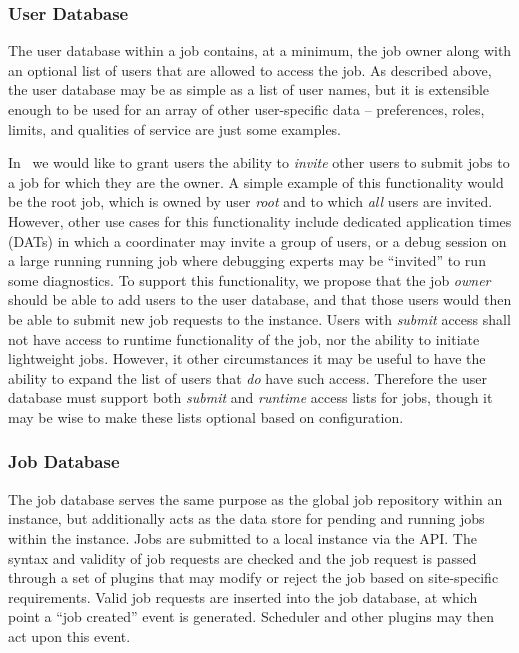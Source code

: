 \subsubsection{User Database}

The user database within a job contains, at a minimum, the job
owner along with an optional list of users that are allowed to
access the job. As described above, the user database may be
as simple as a list of user names, but it is extensible enough
to be used for an array of other user-specific data -- preferences,
roles, limits, and qualities of service are just some examples.

In \ngrm\ we would like to grant users the ability to \emph{invite}
other users to submit jobs to a job for which they are the owner.
A simple example of this functionality would be the root job,
which is owned by user \emph{root} and to which \emph{all} users
are invited. However, other use cases for this functionality
include dedicated application times (DATs) in which a coordinater
may invite a group of users, or a debug session on a large running
running job where debugging experts may be ``invited'' to run some
diagnostics. To support this functionality, we propose that the job
\emph{owner} should be able to add users to the user database, and
that those users would then be able to submit new job requests to
the instance. Users with \emph{submit} access shall not have access
to runtime functionality of the job, nor the ability to initiate
lightweight jobs. However, it other circumstances it may be useful
to have the ability to expand the list of users that \emph{do}
have such access.  Therefore the user database must support both
\emph{submit} and \emph{runtime} access lists for jobs, though it
may be wise to make these lists optional based on configuration.


\subsubsection{Job Database}
\label{sec:jobdatabase}

The job database serves the same purpose as the global job repository
within an instance, but additionally acts as the data store for pending
and running jobs within the instance. Jobs are submitted to a local
instance via the API. The syntax and validity of job requests are checked
and the job request is passed through a set of plugins that may modify
or reject the job based on site-specific requirements. Valid job
requests are inserted into the job database, at which point a
``job created'' event is generated. Scheduler and other plugins may
then act upon this event.

